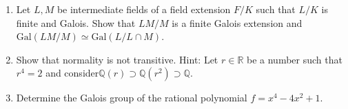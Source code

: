 \documentclass[12pt]{article}
\newcommand{\RR}{{\mathbb R}}
\newcommand{\QQ}{{\mathbb Q}}
\newcommand{\Gal}{\mbox{Gal}}
\begin{document}
\begin{enumerate}
\item    Let $L,M$ be intermediate fields of a field extension $F/K$ such that $L/K$ is finite and Galois.\newline
  Show that $LM/M$ is a finite Galois extension and $\Gal(LM/M)\simeq \Gal(L/L\cap M)$.\vspace{-2pt}

\item Show that normality is not transitive.
  Hint: Let $r\in\RR$ be a number such that $r^4=2$ and consider\newline $\QQ(r)\supset \QQ(r^2) \supset \QQ$.
\vspace{-2pt}



\item   Determine the Galois group of the rational polynomial $f=x^4-4x^2+1$.  \vspace{-2pt}


\end{enumerate}
\end{document}
